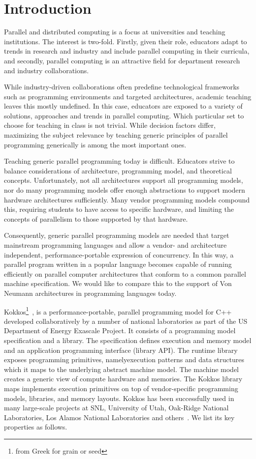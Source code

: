 
\section{Introduction}\label{chap:introduction}

Parallel and distributed computing is a focus at universities and teaching institutions. The interest is two-fold. Firstly, given their role, educators adapt to trends in research and industry and include parallel computing in their curricula, and secondly, parallel computing is an attractive field for department research and industry collaborations. 

While industry-driven collaborations often predefine technological frameworks such as programming environments and targeted architectures, academic teaching leaves this mostly undefined. In this case, educators are exposed to a variety of solutions, approaches and trends in parallel computing. Which particular set to choose for teaching in class is not trivial. While decision factors differ, maximizing the subject relevance by teaching generic principles of parallel programming generically is among the most important ones. 

Teaching generic parallel programming today is difficult. Educators strive to balance considerations of architecture, programming model, and theoretical concepts. Unfortunately, not all architectures support all programming models, nor do many programming models offer enough abstractions to support modern hardware architectures sufficiently. Many vendor programming models compound this, requiring students to have access to specific hardware, and limiting the concepts of parallelism to those supported by that hardware. 

Consequently, generic parallel programming models are needed that target mainstream programming languages and allow a vendor- and architecture independent, performance-portable expression of concurrency. In this way, a parallel program written in a popular language becomes capable of running efficiently on parallel computer architectures that conform to a common parallel machine specification. We would like to compare this to the support of Von Neumann architectures in programming languages today.

Kokkos\footnote{from Greek for grain or seed}~\cite{KOKKOS}, is a performance-portable, parallel programming model for C++ developed collaboratively by a number of national laboratories as part of the US Department of Energy Exascale Project\cite{ECP}. It consists of a programming model specification and a library. The specification defines execution and memory model and an application programming interface (library API). The runtime library exposes programming primitives, namelyexecution patterns and data structures which it maps to the underlying abstract machine model. The machine model creates a generic view of compute hardware and memories. The Kokkos library maps implements execution primitives on top of vendor-specific programming models, libraries, and memory layouts. Kokkos has been successfully used in many large-scale projects at SNL, University of Utah, Oak-Ridge National Laboratories, Los Alamos National Laboratories and others~\cite{KOKKOSPROJS}. We list its key properties as follows.

